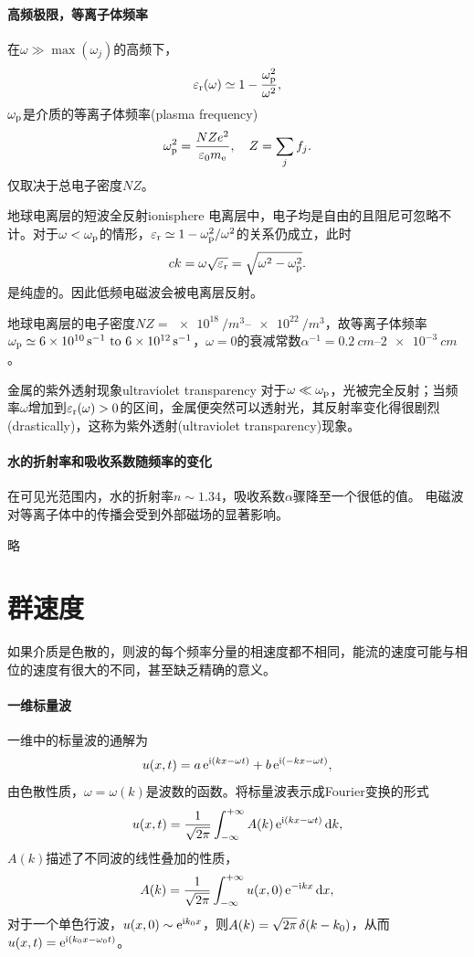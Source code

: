 \paragraph{高频极限，等离子体频率}
在$\omega\gg\max(\omega_j)$的高频下，
\[
    \varepsilon_\text r(\omega)\simeq 1-\frac{\omega_\text p^2}{\omega^2},
\]
$\omega_\text p$是介质的等离子体频率(plasma frequency)
\begin{equation}
    \omega_\text p^2=\frac{NZe^2}{\varepsilon_0m_\mathrm e},\quad Z=\sum_jf_j.
\end{equation}
仅取决于总电子密度$NZ$。
\begin{example}{地球电离层的短波全反射}{ionisphere}
    电离层中，电子均是自由的且阻尼可忽略不计。对于$\omega<\omega_\text p$的情形，$\varepsilon_\text r\simeq 1-\omega_\text p^2/\omega^2$的关系仍成立，此时
    \[
        ck=\omega\sqrt{\varepsilon_\text r}=\sqrt{\omega^2-\omega_\text p^2}.
    \]
    是纯虚的。因此低频电磁波会被电离层反射。

    地球电离层的电子密度$NZ=\SIrange{e18}{e22}{/m^3}$，故等离子体频率$\omega_\text p\simeq\SIrange{6e10}{6e12}{s^{-1}}$，$\omega=0$的衰减常数$\alpha^{-1}=\SIrange{0.2}{2e-3}{cm}$。
\end{example}
\begin{example}{金属的紫外透射现象}{ultraviolet transparency}
    对于$\omega\ll\omega_\text p$，光被完全反射；当频率$\omega$增加到$\varepsilon_\text r(\omega)>0$的区间，金属便突然可以透射光，其反射率变化得很剧烈(drastically)，这称为紫外透射(ultraviolet transparency)现象。
\end{example}
\paragraph{水的折射率和吸收系数随频率的变化}
在可见光范围内，水的折射率$n\sim 1.34$，吸收系数$\alpha$骤降至一个很低的值。
电磁波对等离子体中的传播会受到外部磁场的显著影响。

略

\section{群速度}
如果介质是色散的，则波的每个频率分量的相速度都不相同，能流的速度可能与相位的速度有很大的不同，甚至缺乏精确的意义。
\paragraph{一维标量波}
一维中的标量波的通解为
\[
    u(x,t)=a\mathop{}\!\mathrm{e}^{\mathrm{i}(kx-\omega t)}+b\mathop{}\!\mathrm{e}^{\mathrm{i}(-kx-\omega t)},
\]
由色散性质，$\omega=\omega(k)$是波数的函数。将标量波表示成Fourier变换的形式
\[
    u(x,t)=\frac1{\sqrt{2\pi}}\int_{-\infty}^{+\infty} A(k)\mathop{}\!\mathrm{e}^{\mathrm{i}(kx-\omega t)}\mathop{}\!\mathrm{d} k,
\]
$A(k)$描述了不同波的线性叠加的性质，
\[
    A(k)=\frac1{\sqrt{2\pi}}\int_{-\infty}^{+\infty} u(x,0)\mathop{}\!\mathrm{e}^{-\mathrm{i} kx}\mathop{}\!\mathrm{d} x,
\]
对于一个单色行波，$u(x,0)\sim\mathop{}\!\mathrm{e}^{\mathrm{i} k_0x}$，则$A(k)=\sqrt{2\pi}\mathop{}\!\delta(k-k_0)$，从而$u(x,t)=\mathop{}\!\mathrm{e}^{\mathrm{i}(k_0x-\omega_0t)}$。

